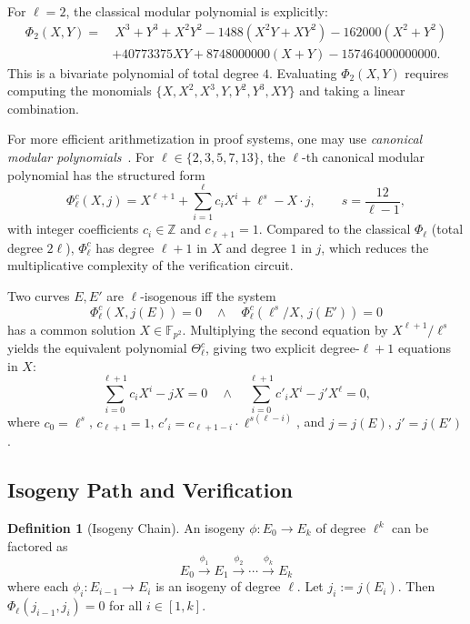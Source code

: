 \documentclass[11pt,a4paper]{article}
\theoremstyle{definition}
\newtheorem{definition}[theorem]{Definition}
\theoremstyle{remark}
\newcommand{\F}{\mathbb{F}}
\newcommand{\Z}{\mathbb{Z}}
\newcommand{\polyrel}{\Phi}
\begin{document}
For $\ell = 2$, the classical modular polynomial is explicitly:
\begin{equation}\label{eq:modpoly2}
	\begin{aligned}
		\polyrel_2(X, Y) = &\ X^3 + Y^3 + X^2Y^2
		- 1488(X^2Y + XY^2) - 162000(X^2 + Y^2) \\
		&+ 40773375XY + 8748000000(X + Y) - 157464000000000.
	\end{aligned}
\end{equation}
This is a bivariate polynomial of total degree $4$. Evaluating
$\polyrel_2(X, Y)$ requires computing the monomials
$\{X, X^2, X^3, Y, Y^2, Y^3, XY\}$ and taking a linear combination.

For more efficient arithmetization in proof systems, one may use
\emph{canonical modular polynomials}~\cite{canonicalModPoly}.
For $\ell \in \{2, 3, 5, 7, 13\}$, the $\ell$-th canonical modular polynomial
has the structured form
\begin{equation}\label{eq:canonical-modpoly}
	\polyrel_{\ell}^c(X, j) = X^{\ell+1} + \sum_{i=1}^{\ell} c_i X^i
	+ \ell^{s} - X \cdot j,
	\qquad s = \frac{12}{\ell - 1},
\end{equation}
with integer coefficients $c_i \in \Z$ and $c_{\ell+1} = 1$.
Compared to the classical $\polyrel_{\ell}$ (total degree $2\ell$),
$\polyrel_{\ell}^c$ has degree $\ell+1$ in $X$ and degree $1$ in $j$,
which reduces the multiplicative complexity of the verification circuit.

Two curves $E, E'$ are $\ell$-isogenous iff the system
\[
	\polyrel_{\ell}^c(X, j(E)) = 0
	\quad \land \quad
	\polyrel_{\ell}^c(\ell^{s}/X,\, j(E')) = 0
\]
has a common solution $X \in \F_{p^2}$.
Multiplying the second equation by $X^{\ell+1}/\ell^{s}$ yields the equivalent
polynomial $\Theta_{\ell}^c$, giving two explicit degree-$\ell+1$
equations in $X$:
\begin{equation}\label{eq:canonical-two-eq}
	\sum_{i=0}^{\ell+1} c_i X^i - j X = 0
	\quad \land \quad
	\sum_{i=0}^{\ell+1} c'_i X^i - j' X^{\ell} = 0,
\end{equation}
where $c_0 = \ell^{s}$, $c_{\ell+1} = 1$,
$c'_i = c_{\ell+1-i} \cdot \ell^{s(\ell-i)}$, and
$j = j(E)$, $j' = j(E')$.

\subsection{Isogeny Path and Verification}

\begin{definition}[Isogeny Chain]
	An isogeny $\phi: E_0 \to E_k$ of degree $\ell^k$ can be factored as
	\[
		E_0 \xrightarrow{\phi_1} E_1 \xrightarrow{\phi_2} \cdots
		\xrightarrow{\phi_k} E_k
	\]
	where each $\phi_i: E_{i-1} \to E_i$ is an isogeny of degree $\ell$.
	Let $j_i := j(E_i)$. Then $\polyrel_{\ell}(j_{i-1}, j_i) = 0$ for all
	$i \in [1, k]$.
\end{definition}
\end{document}

